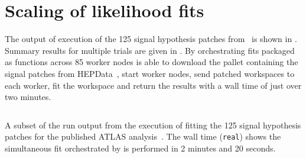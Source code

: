 \section{Scaling of likelihood fits}\label{sec:results}
%
The output of execution of the 125 signal hypothesis patches from~\cite{SUSY-2019-08} is shown in .
Summary results for multiple trials are given in .
By orchestrating \pyhf{} fits packaged as \funcX{} functions across 85 worker nodes \funcX{} is able to download the \pyhf{} pallet containing the signal patches from HEPData~\cite{ATLAS_SUSY_1Lbb_pallet}, start \funcX{} worker nodes, send patched workspaces to each worker, fit the workspace and return the results with a wall time of just over two minutes.
\\

\begin{listing}
 \inputminted{text}{src/code/funcX_demo_output.txt}
 \caption{A subset of the run output from the execution of fitting the 125 signal hypothesis patches for the published ATLAS analysis~\cite{SUSY-2019-08}.
 The wall time (\texttt{real}) shows the simultaneous fit orchestrated by \funcX{} is performed in 2 minutes and 20 seconds.}
 \label{lst:funcX_demo_output}
\end{listing}



